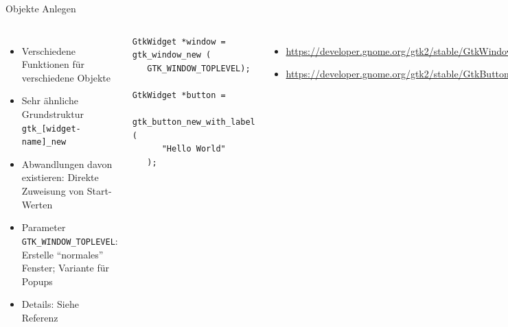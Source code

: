 \begin{frame}[fragile]{Objekte Anlegen}
%
\begin{columns}[T]
\begin{itemize}
\item Verschiedene Funktionen für verschiedene Objekte
\item Sehr ähnliche Grundstruktur\\
	\texttt{gtk\_[widget-name]\_new}
\item Abwandlungen davon existieren: Direkte Zuweisung von Start-Werten
\item Parameter \texttt{GTK\_WINDOW\_TOPLEVEL}: Erstelle \enquote{normales} Fenster; Variante für Popups
\item Details: Siehe Referenz
\end{itemize}
%
\vspace{-6pt}
\begin{codebox}
\begin{verbatim}
GtkWidget *window = gtk_window_new (
   GTK_WINDOW_TOPLEVEL);

GtkWidget *button = 
   gtk_button_new_with_label (
      "Hello World"
   );
\end{verbatim}
\end{codebox}
%
\begin{itemize}
\item \footnotesize \url{https://developer.gnome.org/gtk2/stable/GtkWindow.html}
\item \url{https://developer.gnome.org/gtk2/stable/GtkButton.html}
\end{itemize}
\end{columns}
%
\end{frame}


